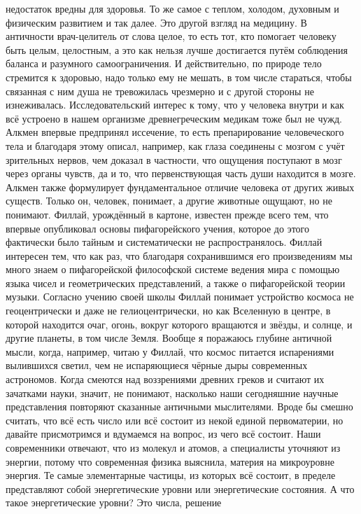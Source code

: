 недостаток вредны для здоровья. То же самое с теплом, холодом, духовным и
физическим развитием и так далее. Это другой взгляд на медицину. В античности
врач-целитель от слова целое, то есть тот, кто помогает человеку быть целым,
целостным, а это как нельзя лучше достигается путём соблюдения баланса и
разумного самоограничения. И действительно, по природе тело стремится к
здоровью, надо только ему не мешать, в том числе стараться, чтобы связанная с
ним душа не тревожилась чрезмерно и с другой стороны не изнеживалась.
Исследовательский интерес к тому, что у человека внутри и как всё устроено в
нашем организме древнегреческим медикам тоже был не чужд. Алкмен впервые
предпринял иссечение, то есть препарирование человеческого тела и благодаря
этому описал, например, как глаза соединены с мозгом с учёт зрительных нервов,
чем доказал в частности, что ощущения поступают в мозг через органы чувств, да и
то, что первенствующая часть души находится в мозге. Алкмен также формулирует
фундаментальное отличие человека от других живых существ. Только он, человек,
понимает, а другие животные ощущают, но не понимают. Филлай, урождённый в
картоне, известен прежде всего тем, что впервые опубликовал основы
пифагорейского учения, которое до этого фактически было тайным и систематически
не распространялось. Филлай интересен тем, что как раз, что благодаря
сохранившимся его произведениям мы много знаем о пифагорейской философской
системе ведения мира с помощью языка чисел и геометрических представлений, а
также о пифагорейской теории музыки. Согласно учению своей школы Филлай понимает
устройство космоса не геоцентрически и даже не гелиоцентрически, но как
Вселенную в центре, в которой находится очаг, огонь, вокруг которого вращаются и
звёзды, и солнце, и другие планеты, в том числе Земля. Вообще я поражаюсь
глубине античной мысли, когда, например, читаю у Филлай, что космос питается
испарениями вылившихся светил, чем не испаряющиеся чёрные дыры современных
астрономов. Когда смеются над воззрениями древних греков и считают их зачатками
науки, значит, не понимают, насколько наши сегодняшние научные представления
повторяют сказанные античными мыслителями. Вроде бы смешно считать, что всё есть
число или всё состоит из некой единой первоматерии, но давайте присмотримся и
вдумаемся на вопрос, из чего всё состоит. Наши современники отвечают, что из
молекул и атомов, а специалисты уточняют из энергии, потому что современная
физика выяснила, материя на микроуровне энергия. Те самые элементарные частицы,
из которых всё состоит, в пределе представляют собой энергетические уровни или
энергетические состояния. А что такое энергетические уровни? Это числа, решение
